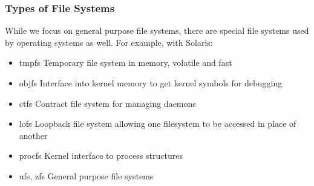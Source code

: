 \documentclass[oneside]{book}
\begin{document}
                    \subsubsection{Types of File Systems}
                        While we focus on general purpose file systems, there are special file systems used by operating systems
                        as well. For example, with Solaris:
                        \begin{itemize}
                            \item tmpfs
                                \subitem Temporary file system in memory, volatile and fast
                            \item objfs
                                \subitem Interface into kernel memory to get kernel symbols for debugging
                            \item ctfs
                                \subitem Contract file system for managing daemons
                            \item lofs
                                \subitem Loopback file system allowing one filesystem to be accessed in place of another
                            \item procfs
                                \subitem Kernel interface to process structures
                            \item ufs, zfs
                                \subitem General purpose file systems
                        \end{itemize}
\end{document}
